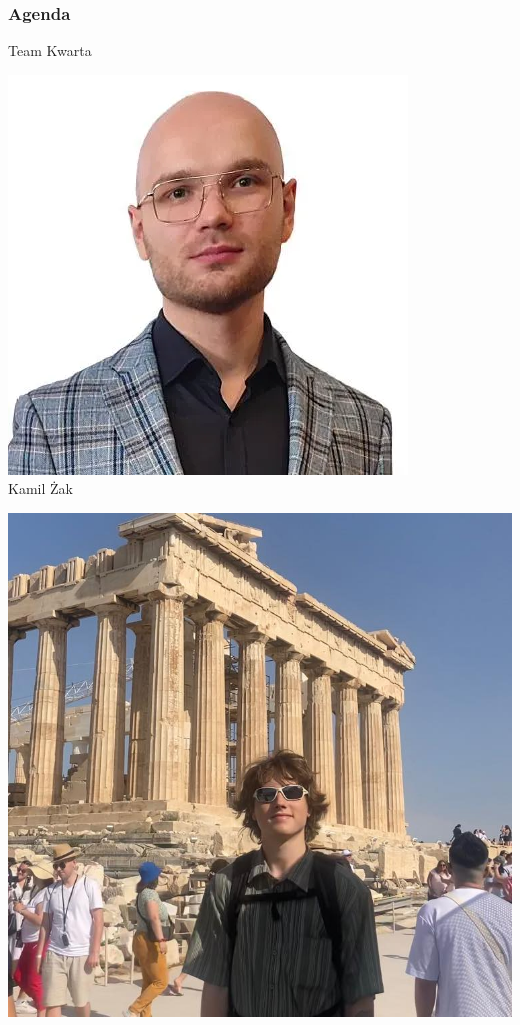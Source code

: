 \frame{\titlepage}

\begin{frame}
\frametitle{Agenda}
\tableofcontents[pausesections]
\end{frame}


\begin{frame}[t]{Team Kwarta}
\centering
\begin{minipage}{0.22\linewidth}
\centering
\includegraphics[width=\linewidth]{img/KZ}\\
\scriptsize Kamil Żak \\
\scriptsize {}
\end{minipage}\pause
\hspace{2em}
\begin{minipage}{0.22\linewidth}
\centering
\includegraphics[width=\linewidth]{img/AK}\\

\end{minipage}
\end{frame}
